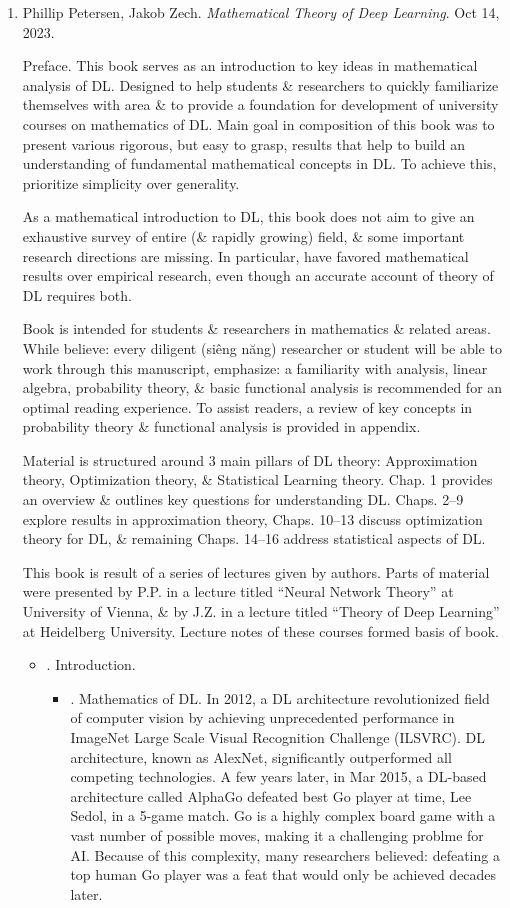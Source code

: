 \documentclass{article}
\begin{document}
\begin{enumerate}
	\item {\sc Phillip Petersen, Jakob Zech}. {\it Mathematical Theory of Deep Learning}. Oct 14, 2023.
	
	{\sf Preface.} This book serves as an introduction to key ideas in mathematical analysis of DL. Designed to help students \& researchers to quickly familiarize themselves with area \& to provide a foundation for development of university courses on mathematics of DL. Main goal in composition of this book was to present various rigorous, but easy to grasp, results that help to build an understanding of fundamental mathematical concepts in DL. To achieve this, prioritize simplicity over generality.
	
	As a mathematical introduction to DL, this book does not aim to give an exhaustive survey of entire (\& rapidly growing) field, \& some important research directions are missing. In particular, have favored mathematical results over empirical research, even though an accurate account of theory of DL requires both.
	
	Book is intended for students \& researchers in mathematics \& related areas. While believe: every diligent (siêng năng) researcher or student will be able to work through this manuscript, emphasize: a familiarity with analysis, linear algebra, probability theory, \& basic functional analysis is recommended for an optimal reading experience. To assist readers, a review of key concepts in probability theory \& functional analysis is provided in appendix.
	
	Material is structured around 3 main pillars of DL theory: Approximation theory, Optimization theory, \& Statistical Learning theory. Chap. 1 provides an overview \& outlines key questions for understanding DL. Chaps. 2--9 explore results in approximation theory, Chaps. 10--13 discuss optimization theory for DL, \& remaining Chaps. 14--16 address statistical aspects of DL.
	
	This book is result of a series of lectures given by authors. Parts of material were presented by P.P. in a lecture titled ``Neural Network Theory'' at University of Vienna, \& by J.Z. in a lecture titled ``Theory of Deep Learning'' at Heidelberg University. Lecture notes of these courses formed basis of book. 
	\begin{itemize}
		\item {. Introduction.}
		\begin{itemize}
			\item {. Mathematics of DL.} In 2012, a DL architecture revolutionized field of computer vision by achieving unprecedented performance in ImageNet Large Scale Visual Recognition Challenge (ILSVRC). DL architecture, known as AlexNet, significantly outperformed all competing technologies. A few years later, in Mar 2015, a DL-based architecture called AlphaGo defeated best Go player at time, {\sc Lee Sedol}, in a 5-game match. Go is a highly complex board game with a vast number of possible moves, making it a challenging problme for AI. Because of this complexity, many researchers believed: defeating a top human Go player was a feat that would only be achieved decades later.
			

\end{itemize}
\end{itemize}
\end{enumerate}
\end{document}
